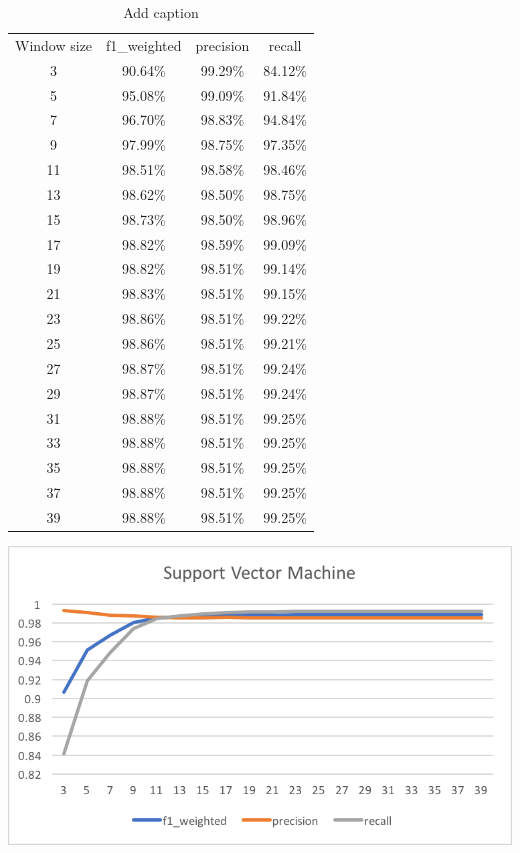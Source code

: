 \documentclass[paper=a4, fontsize=11pt]{scrartcl}
\numberwithin{equation}{section}    %
\numberwithin{figure}{section}      %
\numberwithin{table}{section}       %
\numberwithin{equation}{section}    %
\numberwithin{figure}{section}      %
\numberwithin{table}{section}       %
\begin{document}
\begin{table}[htbp]
  \centering
  \caption{Add caption}
    \begin{tabular}{cccc}
    Window size & f1\_weighted & precision & recall \\
    3     & 90.64\% & 99.29\% & 84.12\% \\
    5     & 95.08\% & 99.09\% & 91.84\% \\
    7     & 96.70\% & 98.83\% & 94.84\% \\
    9     & 97.99\% & 98.75\% & 97.35\% \\
    11    & 98.51\% & 98.58\% & 98.46\% \\
    13    & 98.62\% & 98.50\% & 98.75\% \\
    15    & 98.73\% & 98.50\% & 98.96\% \\
    17    & 98.82\% & 98.59\% & 99.09\% \\
    19    & 98.82\% & 98.51\% & 99.14\% \\
    21    & 98.83\% & 98.51\% & 99.15\% \\
    23    & 98.86\% & 98.51\% & 99.22\% \\
    25    & 98.86\% & 98.51\% & 99.21\% \\
    27    & 98.87\% & 98.51\% & 99.24\% \\
    29    & 98.87\% & 98.51\% & 99.24\% \\
    31    & 98.88\% & 98.51\% & 99.25\% \\
    33    & 98.88\% & 98.51\% & 99.25\% \\
    35    & 98.88\% & 98.51\% & 99.25\% \\
    37    & 98.88\% & 98.51\% & 99.25\% \\
    39    & 98.88\% & 98.51\% & 99.25\% \\
    \end{tabular}%
  \label{tab:addlabel}%
\end{table}%

\begin{center}
\includegraphics{SVM_f1}
\end{center}
\FloatBarrier
\end{document}
